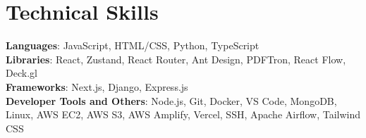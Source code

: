 \documentclass[letterpaper,11pt]{article}
\begin{document}
%
\section{Technical Skills}
 \begin{itemize}[leftmargin=0.15in, label={}]
    \small{\item{
     \textbf{Languages}{: JavaScript, HTML/CSS, Python,  TypeScript} \\
     \textbf{Libraries}{: React, Zustand, React Router, Ant Design, PDFTron, React Flow, Deck.gl } \\
    \textbf{Frameworks}{: Next.js, Django, Express.js} \\
     \textbf{Developer Tools and Others}{: Node.js, Git, Docker,  VS Code, MongoDB, Linux, AWS EC2, AWS S3, AWS Amplify, Vercel, SSH, Apache Airflow, Tailwind CSS } \\
    }}
 \end{itemize}


\end{document}
